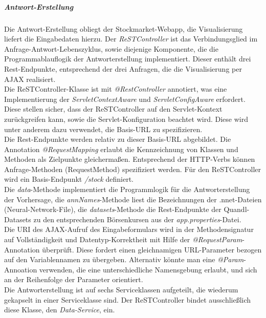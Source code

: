 \subparagraph{Antwort-Erstellung}
Die Antwort-Erstellung obliegt der Stockmarket-Webapp, die Visualisierung liefert die Eingabedaten hierzu. Der \emph{ReSTController} ist das Verbindungsglied im Anfrage-Antwort-Lebenszyklus, sowie diejenige Komponente, die die Programmablauflogik der Antworterstellung implementiert. Dieser enthält drei Rest-Endpunkte, entsprechend der drei Anfragen, die die Visualisierung per AJAX realisiert.\\
Die ReSTController-Klasse ist mit \emph{@RestController} annotiert, was eine Implementierung der \emph{ServletContextAware} und \emph{ServletConfigAware} erfordert. Diese stellen sicher, dass der ReSTController auf den Servlet-Kontext zurückgreifen kann, sowie die Servlet-Konfiguration beachtet wird. Diese wird unter anderem dazu verwendet, die Basis-URL zu spezifizieren.\\
Die Rest-Endpunkte werden relativ zu dieser Basis-URL abgebildet. Die Annotation \emph{@RequestMapping} erlaubt die Kennzeichnung von Klassen und Methoden als Zielpunkte gleichermaßen. Entsprechend der HTTP-Verbs können Anfrage-Methoden (RequestMethod) spezifiziert werden. Für den ReSTController wird ein Basis-Endpunkt \emph{/stock} definiert.\\  
Die \emph{data}-Methode implementiert die Programmlogik für die Antworterstellung der Vorhersage, die \emph{annNames}-Methode liest die Bezeichnungen der .nnet-Dateien (Neural-Network-File), die \emph{datasets}-Methode die Rest-Endpunkte der Quandl-Datasets zu den entsprechenden Börsenkursen aus der \emph{app.properties}-Datei.\\
Die URI des AJAX-Aufruf des Eingabeformulars wird in der Methodensignatur auf Vollständigkeit und Datentyp-Korrektheit mit Hilfe der \emph{@RequestParam}-Annotation überprüft. Diese fordert einen gleichnamigen URL-Parameter bezogen auf den Variablennamen zu übergeben. Alternativ könnte man eine \emph{@Param}-Annoation verwenden, die eine unterschiedliche Namensgebung erlaubt, und sich an der Reihenfolge der Parameter orientiert. \\
Die Antworterstellung ist auf sechs Serviceklassen aufgeteilt, die wiederum gekapselt in einer Serviceklasse sind. Der ReSTController bindet ausschließlich diese Klasse, den \emph{Data-Service}, ein.\\

